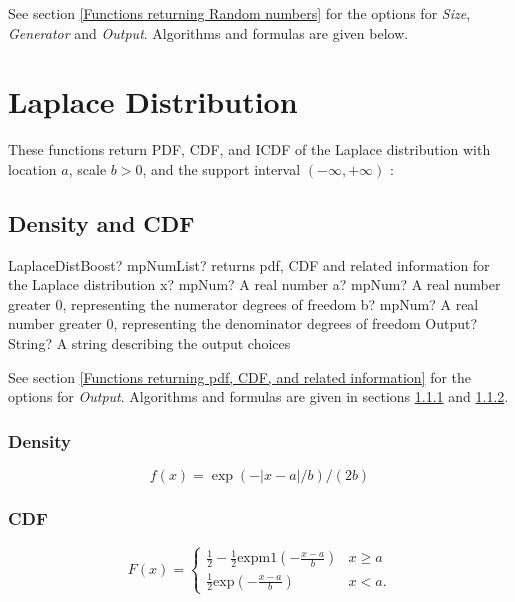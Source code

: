 \vspace{0.3cm}

See section \ref{Functions returning Random numbers} for the options for  {\itshape\sffamily Size},  {\itshape\sffamily Generator} and {\itshape\sffamily Output}. Algorithms and formulas are given below.





\section{Laplace Distribution}
These functions return PDF, CDF, and ICDF of the Laplace distribution with location
$a$, scale $b > 0$, and the support interval $(-\infty,+\infty)$ :


\subsection{Density and CDF}
\begin{mpFunctionsExtract}
	\mpFunctionFour
	{LaplaceDistBoost? mpNumList? returns pdf, CDF and related information for the Laplace distribution}
	{x? mpNum? A real number}
	{a? mpNum? A real number greater 0, representing the numerator  degrees of freedom}
	{b? mpNum? A real number greater 0, representing the denominator degrees of freedom}
	{Output? String? A string describing the output choices}
\end{mpFunctionsExtract}


\vspace{0.3cm}
See section \ref{Functions returning pdf, CDF, and related information} for the options for {\itshape\sffamily Output}. Algorithms and formulas are given in sections \ref{LaplaceDistributionDensity} and \ref{LaplaceDistributionCDF}.


\subsubsection{Density}
\label{LaplaceDistributionDensity}

\begin{equation} 
	f(x)= \exp(- \vert x-a \vert /b)/(2b)
\end{equation}


\subsubsection{CDF}
\label{LaplaceDistributionCDF}

\begin{equation}
	F(x)=\begin{cases}
		\frac{1}{2} - \frac{1}{2} \text{expm1}\left(- \frac{x-a}{b}\right) & x \geq a\\
		\frac{1}{2} \text{exp}\left(- \frac{x-a}{b}\right) & x<a.
	\end{cases}
\end{equation}




